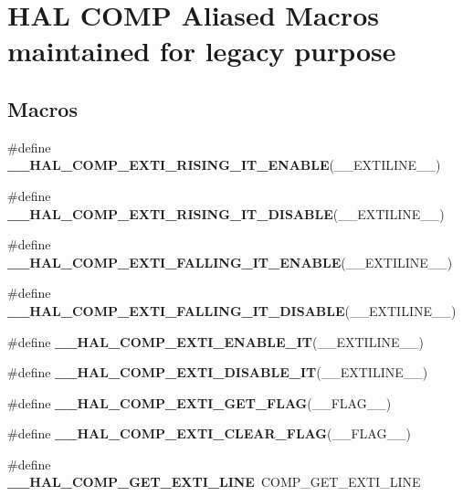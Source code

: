 \hypertarget{group___h_a_l___c_o_m_p___aliased___macros}{}\section{H\+AL C\+O\+MP Aliased Macros maintained for legacy purpose}
\label{group___h_a_l___c_o_m_p___aliased___macros}
\subsection*{Macros}
\begin{DoxyCompactItemize}
\item 
\#define {\bfseries \+\_\+\+\_\+\+H\+A\+L\+\_\+\+C\+O\+M\+P\+\_\+\+E\+X\+T\+I\+\_\+\+R\+I\+S\+I\+N\+G\+\_\+\+I\+T\+\_\+\+E\+N\+A\+B\+LE}(\+\_\+\+\_\+\+E\+X\+T\+I\+L\+I\+N\+E\+\_\+\+\_\+)
\item 
\#define {\bfseries \+\_\+\+\_\+\+H\+A\+L\+\_\+\+C\+O\+M\+P\+\_\+\+E\+X\+T\+I\+\_\+\+R\+I\+S\+I\+N\+G\+\_\+\+I\+T\+\_\+\+D\+I\+S\+A\+B\+LE}(\+\_\+\+\_\+\+E\+X\+T\+I\+L\+I\+N\+E\+\_\+\+\_\+)
\item 
\#define {\bfseries \+\_\+\+\_\+\+H\+A\+L\+\_\+\+C\+O\+M\+P\+\_\+\+E\+X\+T\+I\+\_\+\+F\+A\+L\+L\+I\+N\+G\+\_\+\+I\+T\+\_\+\+E\+N\+A\+B\+LE}(\+\_\+\+\_\+\+E\+X\+T\+I\+L\+I\+N\+E\+\_\+\+\_\+)
\item 
\#define {\bfseries \+\_\+\+\_\+\+H\+A\+L\+\_\+\+C\+O\+M\+P\+\_\+\+E\+X\+T\+I\+\_\+\+F\+A\+L\+L\+I\+N\+G\+\_\+\+I\+T\+\_\+\+D\+I\+S\+A\+B\+LE}(\+\_\+\+\_\+\+E\+X\+T\+I\+L\+I\+N\+E\+\_\+\+\_\+)
\item 
\#define {\bfseries \+\_\+\+\_\+\+H\+A\+L\+\_\+\+C\+O\+M\+P\+\_\+\+E\+X\+T\+I\+\_\+\+E\+N\+A\+B\+L\+E\+\_\+\+IT}(\+\_\+\+\_\+\+E\+X\+T\+I\+L\+I\+N\+E\+\_\+\+\_\+)
\item 
\#define {\bfseries \+\_\+\+\_\+\+H\+A\+L\+\_\+\+C\+O\+M\+P\+\_\+\+E\+X\+T\+I\+\_\+\+D\+I\+S\+A\+B\+L\+E\+\_\+\+IT}(\+\_\+\+\_\+\+E\+X\+T\+I\+L\+I\+N\+E\+\_\+\+\_\+)
\item 
\#define {\bfseries \+\_\+\+\_\+\+H\+A\+L\+\_\+\+C\+O\+M\+P\+\_\+\+E\+X\+T\+I\+\_\+\+G\+E\+T\+\_\+\+F\+L\+AG}(\+\_\+\+\_\+\+F\+L\+A\+G\+\_\+\+\_\+)
\item 
\#define {\bfseries \+\_\+\+\_\+\+H\+A\+L\+\_\+\+C\+O\+M\+P\+\_\+\+E\+X\+T\+I\+\_\+\+C\+L\+E\+A\+R\+\_\+\+F\+L\+AG}(\+\_\+\+\_\+\+F\+L\+A\+G\+\_\+\+\_\+)
\item 
\#define {\bfseries \+\_\+\+\_\+\+H\+A\+L\+\_\+\+C\+O\+M\+P\+\_\+\+G\+E\+T\+\_\+\+E\+X\+T\+I\+\_\+\+L\+I\+NE}~C\+O\+M\+P\+\_\+\+G\+E\+T\+\_\+\+E\+X\+T\+I\+\_\+\+L\+I\+NE\hypertarget{group___h_a_l___c_o_m_p___aliased___macros_ga76e980c077c5398741f133b81091d5e9}{}\label{group___h_a_l___c_o_m_p___aliased___macros_ga76e980c077c5398741f133b81091d5e9}

\end{DoxyCompactItemize}


